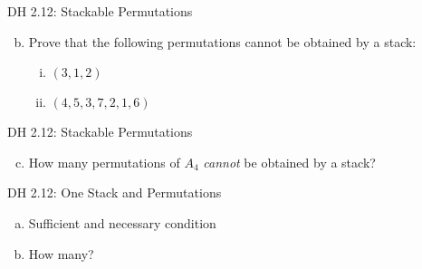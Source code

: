 \begin{frame}{}
  \begin{exampleblock}{DH 2.12: Stackable Permutations}
    \begin{enumerate}[(a)]
      \setcounter{enumi}{1}
      \item Prove that the following permutations cannot be obtained by a stack:
	\begin{enumerate}[(i)]
	  \item $(3, 1, 2)$
	  \item $(4, 5, 3, 7, 2, 1, 6)$
	\end{enumerate}
    \end{enumerate}
  \end{exampleblock}
\end{frame}

\begin{frame}{}
  \begin{exampleblock}{DH 2.12: Stackable Permutations}
    \begin{enumerate}[(a)]
      \setcounter{enumi}{2}
      \item How many permutations of $A_4$ \emph{cannot} be obtained by a stack?
    \end{enumerate}
  \end{exampleblock}
\end{frame}

\begin{frame}{}
  \begin{exampleblock}{DH 2.12: One Stack and Permutations}
    \begin{enumerate}[(a)]
      \item Sufficient and necessary condition
      \item How many?
    \end{enumerate}
  \end{exampleblock}
\end{frame}

